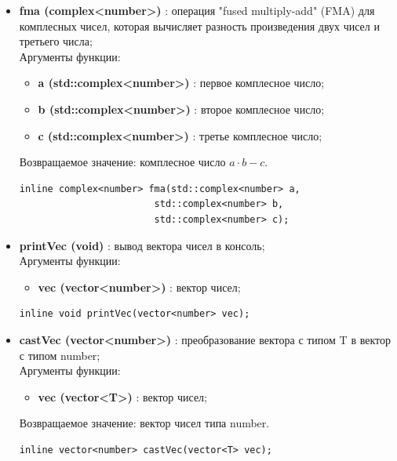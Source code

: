 \documentclass[a4paper,12pt]{article}
\begin{document}
\begin{itemize}
    \item \textbf{fma (complex<number>)} : операция "fused multiply-add" (FMA) для комплесных чисел, которая вычисляет разность произведения двух чисел и третьего числа;
    \\Аргументы функции:
    \begin{itemize}
        \renewcommand{\labelitemi}{-}
        \item \textbf{a (std::complex<number>)} : первое комплесное число;
        \item \textbf{b (std::complex<number>)} : второе комплесное число;
        \item \textbf{c (std::complex<number>)} : третье комплесное число;
    \end{itemize}
    Возвращаемое значение: комплесное число $a\cdot b - c$.
    \begin{lstlisting}[language=С++]
inline complex<number> fma(std::complex<number> a, 
                        std::complex<number> b, 
                        std::complex<number> c); \end{lstlisting}

    \item \textbf{printVec (void)} : вывод вектора чисел в консоль;
    \\Аргументы функции:
    \begin{itemize}
        \renewcommand{\labelitemi}{-}
        \item \textbf{vec (vector<number>)} : вектор чисел;
    \end{itemize}
    \begin{lstlisting}[language=С++]
inline void printVec(vector<number> vec); \end{lstlisting}

    \item \textbf{castVec (vector<number>)} : преобразование вектора с типом T в вектор с типом number;
    \\Аргументы функции:
    \begin{itemize}
        \renewcommand{\labelitemi}{-}
        \item \textbf{vec (vector<T>)} : вектор чисел;
    \end{itemize}
    Возвращаемое значение: вектор чисел типа number.
    \begin{lstlisting}[language=С++]
inline vector<number> castVec(vector<T> vec); \end{lstlisting}
\end{itemize}
\end{document}

